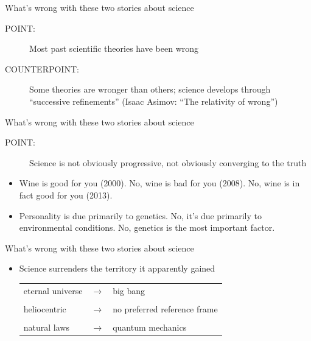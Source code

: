 \documentclass{beamer}
\begin{document}
\begin{frame}{What's wrong with these two stories about science}

\begin{description}
\item[POINT:] Most past scientific theories have been wrong
\item[COUNTERPOINT:] Some theories are wronger than others; science
  develops through ``successive refinements'' (Isaac Asimov: ``The
  relativity of wrong'')
\end{description}

\end{frame}

\begin{frame}{What's wrong with these two stories about science}

\begin{description} 
\item[POINT:] Science is not obviously progressive, not obviously
  converging to the truth \end{description}

\bigskip
\begin{itemize}
\item Wine is good for you (2000).  No, wine is bad for you (2008).
  No, wine is in fact good for you (2013).
\item Personality is due primarily to genetics.  No, it's due
  primarily to environmental conditions.  No, genetics is the most
  important factor.
\end{itemize}



\end{frame}

\begin{frame}{What's wrong with these two stories about science}

\begin{itemize}
\item Science surrenders the territory it apparently gained

\bigskip \begin{tabular}{lll}
eternal universe & $\longrightarrow$ & big bang \\ \\ 
heliocentric & $\longrightarrow$ & no preferred reference frame \\ \\
natural laws & $\longrightarrow$ & quantum mechanics \end{tabular}
\end{itemize}



\end{frame}
\end{document}
